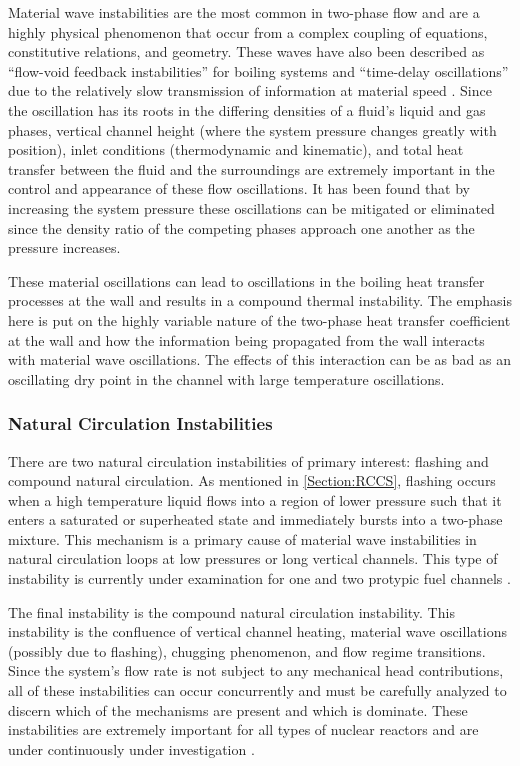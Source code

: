 Material wave instabilities are the most common in two-phase flow and are a highly physical phenomenon that occur from a complex coupling of \THs equations, constitutive relations, and geometry.
These waves have also been described as ``flow-void feedback instabilities'' for boiling systems \cite{neal_mechanisms_1967} and ``time-delay oscillations'' due to the relatively slow transmission of information at material speed \cite{boure_oscillatory_1966}.
Since the oscillation has its roots in the differing densities of a fluid's liquid and gas phases, vertical channel height (where the system pressure changes greatly with position), inlet conditions (thermodynamic and kinematic), and total heat transfer between the fluid and the surroundings are extremely important in the control and appearance of these flow oscillations.
It has been found that by increasing the system pressure these oscillations can be mitigated or eliminated since the density ratio of the competing phases approach one another as the pressure increases.

These material oscillations can lead to oscillations in the boiling heat transfer processes at the wall and results in a compound thermal instability.
The emphasis here is put on the highly variable nature of the two-phase heat transfer coefficient at the wall and how the information being propagated from the wall interacts with material wave oscillations.
The effects of this interaction can be as bad as an oscillating dry point in the channel with large temperature oscillations.



\subsubsection{Natural Circulation Instabilities}
There are two natural circulation instabilities of primary interest: flashing and compound natural circulation.
As mentioned in \cref{Section:RCCS}, flashing occurs when a high temperature liquid flows into a region of lower pressure such that it enters a saturated or superheated state and immediately bursts into a two-phase mixture.
This mechanism is a primary cause of material wave instabilities in natural circulation loops at low pressures or long vertical channels.
This type of instability is currently under examination for one and two protypic fuel channels \cite{marcel_experimental_2009,marcel_experimental_2010}.

The final instability is the compound natural circulation instability.
This instability is the confluence of vertical channel heating, material wave oscillations (possibly due to flashing), chugging phenomenon, and flow regime transitions.
Since the system's flow rate is not subject to any mechanical head contributions, all of these instabilities can occur concurrently and must be carefully analyzed to discern which of the mechanisms are present and which is dominate.
These instabilities are extremely important for all types of nuclear reactors and are under continuously under investigation \cite{dauria_characterization_1990,aritomi_fundamental_1992,yun_twophase_2005}.

